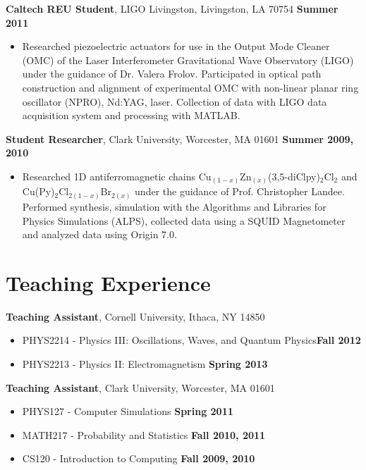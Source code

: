 \documentclass[margin,line]{res}
\begin{document}
\begin{resume}
    \textbf{Caltech REU Student}, LIGO Livingston, Livingston, LA 70754 \hfill \textbf{Summer 2011}
    \vspace*{1mm}
    \begin{itemize}
        \item [ ] Researched piezoelectric actuators for use in the
        Output Mode Cleaner (OMC) of the Laser Interferometer Gravitational Wave
        Observatory (LIGO) under the guidance of Dr. Valera Frolov. Participated in
        optical path construction and alignment of experimental OMC with non-linear
        planar ring oscillator (NPRO), Nd:YAG, laser. Collection of data with LIGO data
        acquisition system and processing with MATLAB.
    \end{itemize} 

    \textbf{Student Researcher}, Clark University, Worcester, MA 01601 \hfill \textbf{Summer 2009, 2010}
    \vspace*{1mm}
    \begin{itemize}
        \item [ ] Researched 1D antiferromagnetic chains
        Cu$_{(1-x)}$Zn$_{(x)}$(3,5-diClpy)$_2$Cl$_2$ and\\
        Cu(Py)$_2$Cl$_{2(1-x)}$Br$_{2(x)}$ under the guidance of Prof. Christopher
        Landee. Performed synthesis, simulation with the Algorithms and
        Libraries for Physics Simulations (ALPS), collected data using a SQUID
        Magnetometer and analyzed data using Origin 7.0.
    \end{itemize} 
    
\section{\sc Teaching Experience} 
    \textbf{Teaching Assistant}, Cornell University, Ithaca, NY 14850
    \vspace*{1mm}
    \begin{itemize} 
        \item [ ] PHYS2214 - Physics III: Oscillations, Waves, and Quantum Physics\hfill \textbf{Fall 2012}
        \item [ ] PHYS2213 - Physics II: Electromagnetism \hfill \textbf{Spring 2013}
    \end{itemize} 
    
    \textbf{Teaching Assistant}, Clark University, Worcester, MA 01601
    \vspace*{1mm}
    \begin{itemize} 
        \item [ ] PHYS127 - Computer Simulations \hfill \textbf{Spring 2011}
        \item [ ] MATH217 - Probability and Statistics \hfill \textbf{Fall 2010, 2011}
        \item [ ] CS120 - Introduction to Computing \hfill \textbf{Fall 2009, 2010}
    \end{itemize} 


\end{resume}
\end{document}
